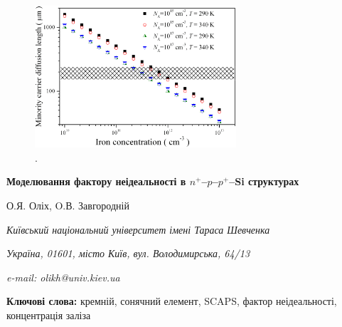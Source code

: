 \documentclass[12pt]{article}
\begin{document}
\begin{figure}
\includegraphics[width=7.5cm]{FigLn}
\caption{.
}
\label{FigLn}
\end{figure}



\newpage

\begin{center}
{\bfseries Моделювання фактору неідеальності в $n^+$--$p$--$p^+$--Si структурах}

О.Я. Оліх, O.В. Завгородній

\emph{Київський національний університет імені Тараса Шевченка}

\emph{Україна, 01601, місто Київ, вул. Володимирська, 64/13}

\emph{e-mail: olikh@univ.kiev.ua}

\end{center}



\textbf{Ключові слова:}
кремній, сонячний елемент, SCAPS, фактор неідеальності, концентрація заліза
\end{document}
